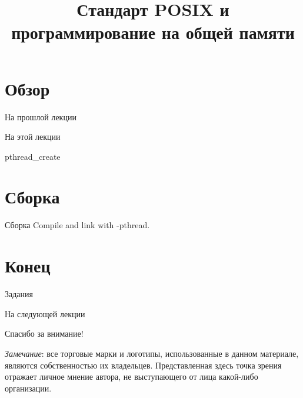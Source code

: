 

\title{Стандарт POSIX и программирование на общей памяти}



\begin{frame}
\titlepage
\end{frame}

\section*{Обзор}

\begin{frame}{На прошлой лекции}
\end{frame}

\begin{frame}{На этой лекции}
\tableofcontents
\end{frame} 


\begin{frame}{pthread_create}

\create

\end{frame}

\section{Сборка}

\begin{frame}{Сборка}
Compile and link with -pthread.
\end{frame}

\section*{Конец}

\begin{frame}{Задания}
\end{frame}

\begin{frame}{На следующей лекции}
\end{frame}

\begin{frame}

{\huge{Спасибо за внимание!}\par}

\vfill

\tiny{\textit{Замечание}: все торговые марки и логотипы, использованные в данном материале, являются собственностью их владельцев. Представленная здесь точка зрения отражает личное мнение автора, не выступающего от лица какой-либо организации.}

\end{frame}

